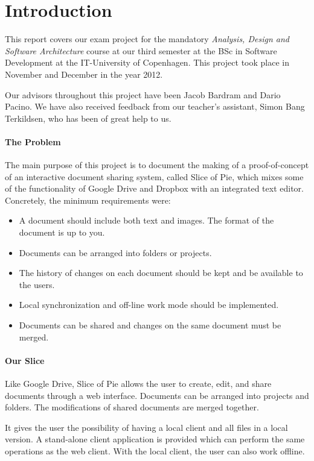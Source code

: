 \section{Introduction}
This report covers our exam project for the mandatory \emph{Analysis, Design and Software Architecture}
course at our third semester at the BSc in Software Development at the IT-University of Copenhagen.
This project took place in November and December in the year 2012. 

Our advisors throughout this project have been Jacob Bardram and Dario Pacino. We have also received feedback from
our teacher's assistant, Simon Bang Terkildsen, who has been of great help to us.

\paragraph{The Problem}
The main purpose of this project is to document the making of a proof-of-concept of an interactive document
sharing system, called Slice of Pie, which mixes some of the functionality of Google Drive and Dropbox with
an integrated text editor.
Concretely, the minimum requirements were:
\begin{itemize}
\item A document should include both text and images. The format of the document is up to you.
\item Documents can be arranged into folders or projects.
\item The history of changes on each document should be kept and be available to the users.
\item Local synchronization and off-line work mode should be implemented.
\item Documents can be shared and changes on the same document must be merged.
\end{itemize}
\paragraph{Our Slice}
Like Google Drive, Slice of Pie allows the user to create, edit, and share documents through a web interface.
Documents can be arranged into projects and folders. The modifications of shared documents are merged together.

It gives the user the possibility of having a local client and all files in a local version. A stand-alone client
application is provided which can perform the same operations as the web client. With the local client, the user
can also work offline.

